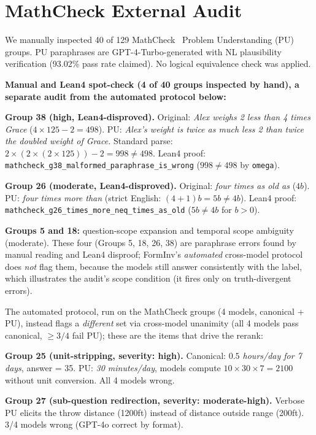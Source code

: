 \documentclass{article}
\begin{document}
\section{MathCheck External Audit}
\label{app:mathcheck}

We manually inspected 40 of 129 MathCheck~\citep{zhou2024mathcheck} Problem Understanding (PU) groups.
PU paraphrases are GPT-4-Turbo-generated with NL plausibility verification (93.02\% pass rate claimed).
No logical equivalence check was applied.

\textbf{Manual and Lean4 spot-check (4 of 40 groups inspected by hand), a separate audit from the automated protocol below:}

\textbf{Group 38 (high, Lean4-disproved).}
Original: \emph{Alex weighs 2 less than 4 times Grace} ($4\times125-2=498$).
PU: \emph{Alex's weight is twice as much less 2 than twice the doubled weight of Grace.}
Standard parse: $2\times(2\times(2\times125))-2=998\neq498$.
Lean4 proof: \texttt{mathcheck\_g38\_malformed\_paraphrase\_is\_wrong} ($998 \neq 498$ by \texttt{omega}).

\textbf{Group 26 (moderate, Lean4-disproved).}
Original: \emph{four times as old as} ($4b$).
PU: \emph{four times more than} (strict English: $(4+1)b=5b\neq4b$).
Lean4 proof: \texttt{mathcheck\_g26\_times\_more\_neq\_times\_as\_old} ($5b\neq4b$ for $b>0$).

\textbf{Groups 5 and 18:} question-scope expansion and temporal scope ambiguity (moderate).
These four (Groups 5, 18, 26, 38) are paraphrase errors found by manual reading and Lean4 disproof; FormInv's \emph{automated} cross-model protocol does \emph{not} flag them, because the models still answer consistently with the label, which illustrates the audit's scope condition (it fires only on truth-divergent errors).

The automated protocol, run on the MathCheck groups (4 models, canonical + PU), instead flags a \emph{different} set via cross-model unanimity (all 4 models pass canonical, $\geq 3/4$ fail PU); these are the items that drive the rerank:

\textbf{Group 25 (unit-stripping, severity: high).} Canonical: \emph{$0.5$ hours/day for 7 days}, answer = 35.
PU: \emph{30 minutes/day}, models compute $10{\times}30{\times}7 = 2100$ without unit conversion. All 4 models wrong.

\textbf{Group 27 (sub-question redirection, severity: moderate-high).} Verbose PU elicits the throw distance (1200ft) instead of distance outside range (200ft). 3/4 models wrong (GPT-4o correct by format).
\end{document}
